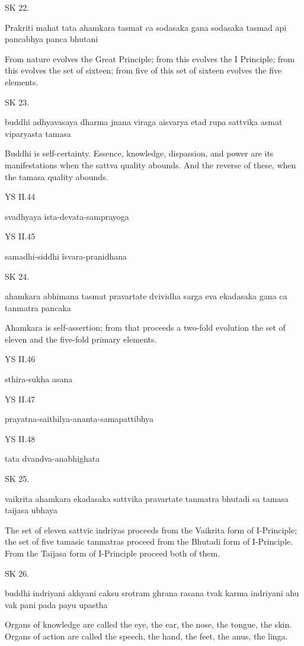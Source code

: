 SK 22.

Prakriti mahat tata ahamkara tasmat ca sodasaka gana
sodasaka tasmad api pancabhya panca bhutani

From nature evolves the Great Principle;
from this evolves the I Principle;
from this evolves the set of sixteen;
from five of this set of sixteen evolves the five elements.

SK 23.

buddhi adhyavasaya dharma jnana viraga aisvarya
etad rupa sattvika asmat viparyasta tamasa

Buddhi is self-certainty.
Essence, knowledge, dispassion, and power
are its manifestations
when the sattva quality abounds.
And the reverse of these,
when the tamasa quality abounds.

YS II.44

    svadhyaya ista-devata-samprayoga

YS II.45

    samadhi-siddhi îsvara-pranidhana

SK 24.

ahamkara abhimana tasmat pravartate dvividha sarga eva
ekadasaka gana ca tanmatra pancaka

Ahamkara is self-assertion;
from that proceeds a two-fold evolution
the set of eleven and the five-fold primary elements.

YS II.46

    sthira-sukha asana

YS II.47

    prayatna-saithilya-ananta-samapattibhya

YS II.48

    tata dvandva-anabhighata

SK 25.

vaikrita ahamkara ekadasaka sattvika pravartate
tanmatra bhutadi sa tamasa taijasa ubhaya

The set of eleven sattvic indriyas proceeds from
the Vaikrita form of I-Principle;
the set of five tamasic tanmatras proceed from
the Bhutadi form of I-Principle.
From the Taijasa form of I-Principle proceed both of them.

SK 26.

buddhi indriyani akhyani caksu srotram ghrana rasana tvak
karma indriyani ahu vak pani pada payu upastha

Organs of knowledge are called
    the eye, the ear, the nose, the tongue, the skin.
Organs of action are called
    the speech, the hand, the feet, the anus, the linga.

